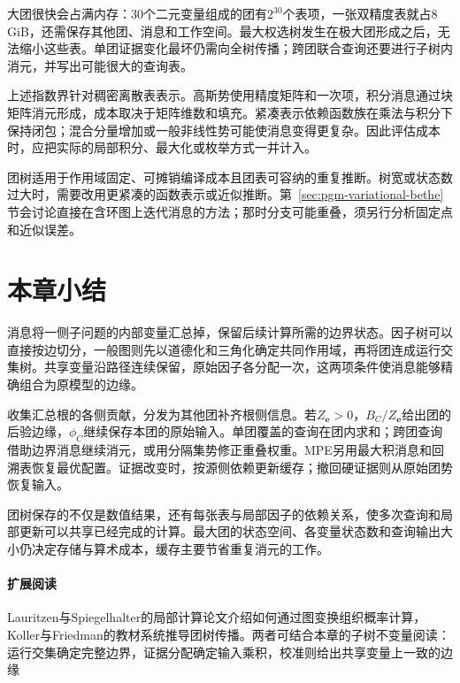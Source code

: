 大团很快会占满内存：$30$个二元变量组成的团有$2^{30}$个表项，一张双精度表就占$8$\,GiB，还需保存其他团、消息和工作空间。最大权选树发生在极大团形成之后，无法缩小这些表。单团证据变化最坏仍需向全树传播；跨团联合查询还要进行子树内消元，并写出可能很大的查询表。

上述指数界针对稠密离散表表示。高斯势使用精度矩阵和一次项，积分消息通过块矩阵消元形成，成本取决于矩阵维数和填充。紧凑表示依赖函数族在乘法与积分下保持闭包；混合分量增加或一般非线性势可能使消息变得更复杂。因此评估成本时，应把实际的局部积分、最大化或枚举方式一并计入。

团树适用于作用域固定、可摊销编译成本且团表可容纳的重复推断。树宽或状态数过大时，需要改用更紧凑的函数表示或近似推断。第~\ref{sec:pgm-variational-bethe}节会讨论直接在含环图上迭代消息的方法；那时分支可能重叠，须另行分析固定点和近似误差。

\section{本章小结}
\label{sec:pgm-junction-tree-summary}

消息将一侧子问题的内部变量汇总掉，保留后续计算所需的边界状态。因子树可以直接按边切分，一般图则先以道德化和三角化确定共同作用域，再将团连成运行交集树。共享变量沿路径连续保留，原始因子各分配一次，这两项条件使消息能够精确组合为原模型的边缘。

收集汇总根的各侧贡献，分发为其他团补齐根侧信息。若$Z_{\bm e}>0$，$B_C/Z_{\bm e}$给出团的后验边缘，$\phi_C$继续保存本团的原始输入。单团覆盖的查询在团内求和；跨团查询借助边界消息继续消元，或用分隔集势修正重叠权重。MPE另用最大积消息和回溯表恢复最优配置。证据改变时，按源侧依赖更新缓存；撤回硬证据则从原始团势恢复输入。

团树保存的不仅是数值结果，还有每张表与局部因子的依赖关系，使多次查询和局部更新可以共享已经完成的计算。最大团的状态空间、各变量状态数和查询输出大小仍决定存储与算术成本，缓存主要节省重复消元的工作。

\paragraph{扩展阅读}
Lauritzen与Spiegelhalter的局部计算论文介绍如何通过图变换组织概率计算，Koller与Friedman的教材系统推导团树传播。两者可结合本章的子树不变量阅读：运行交集确定完整边界，证据分配确定输入乘积，校准则给出共享变量上一致的边缘
